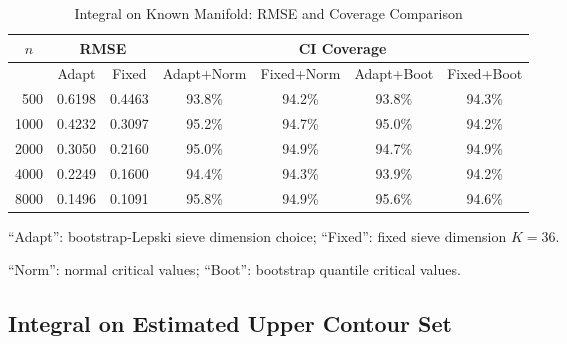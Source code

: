\documentclass[12pt,american]{article}
\theoremstyle{definition}
\theoremstyle{plain}
\theoremstyle{definition}
\theoremstyle{plain}
\theoremstyle{plain}
\theoremstyle{plain}
\theoremstyle{plain}
\theoremstyle{plain}
\begin{document}
\begin{table}[h]
  \centering
  \caption{Integral on Known Manifold: RMSE and Coverage Comparison}
  \label{tab:Sim1_Circle_Comp}
  \begin{threeparttable}
    \begin{tabular}{r|cc|cccc}
      \toprule
      \multicolumn{1}{c}{$n$ }  & \multicolumn{2}{c}{RMSE}   & \multicolumn{4}{c}{CI Coverage} \\
      \midrule
      & Adapt & Fixed & Adapt+Norm  & Fixed+Norm  & Adapt+Boot & Fixed+Boot \\
      \midrule
      500  & 0.6198 & 0.4463 & 93.8\% & 94.2\% & 93.8\% & 94.3\%\\
      1000 & 0.4232 & 0.3097 & 95.2\% & 94.7\% & 95.0\% & 94.2\%\\
      2000 & 0.3050 & 0.2160 & 95.0\% & 94.9\% & 94.7\% & 94.9\%\\
      4000 & 0.2249 & 0.1600 & 94.4\% & 94.3\% & 93.9\% & 94.2\% \\
      8000 & 0.1496 & 0.1091 & 95.8\% & 94.9\% & 95.6\% & 94.6\%\\
      \bottomrule
    \end{tabular}
    \begin{tablenotes}
      \footnotesize
    \item ``Adapt'': bootstrap-Lepski sieve dimension choice; ``Fixed'': fixed sieve dimension $K=36$.
    \item ``Norm'': normal critical values; ``Boot'': bootstrap quantile critical values.
    \end{tablenotes}
  \end{threeparttable}
\end{table}
% 

\subsection{\label{subsec:Sim2_Disk} Integral on Estimated Upper Contour Set}
\end{document}

